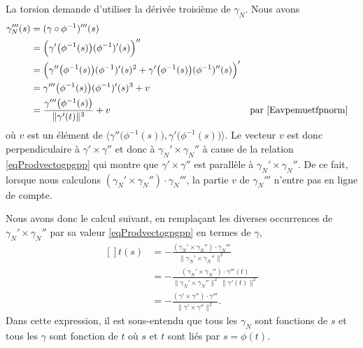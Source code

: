 La torsion demande d'utiliser la dérivée troisième de \( \gamma_N\). Nous avons
\begin{equation}
	\begin{aligned}[]
		\gamma_N'''(s) & =(\gamma\circ\phi^{-1})'''(s)                                                                                                                           \\
		               & =\Big( \gamma'\big( \phi^{-1}(s) \big)(\phi^{-1})'(s) \Big)''                                                                                           \\
		               & =\Big( \gamma''\big( \phi^{-1}(s) \big)(\phi^{-1})'(s)^2+\gamma'\big( \phi^{-1}(s) \big)(\phi^{-1})''(s) \Big)'                                         \\
		               & =\gamma'''\big( \phi^{-1}(s) \big)(\phi^{-1})'(s)^3+ v                                                                                                  \\
		               & =\frac{ \gamma'''\big( \phi^{-1}(s) \big) }{ \| \gamma'(t) \|^3 }+v                                             &  & \text{par \eqref{Eavpemuetfpnorm}}
	\end{aligned}
\end{equation}
où \( v\) est un élément de \( \langle \gamma''\big( \phi^{-1}(s) \big),\gamma'\big( \phi^{-1}(s) \big)\rangle\). Le vecteur \( v\) est donc perpendiculaire à \( \gamma'\times \gamma''\) et donc à \( \gamma_N'\times \gamma_N''\) à cause de la relation \eqref{eqProdvectogpgpp} qui montre que \( \gamma'\times \gamma''\) est parallèle à \( \gamma_N'\times \gamma_N''\). De ce fait, lorsque nous calculons \( (\gamma_N'\times \gamma_N'')\cdot \gamma_N'''\), la partie \( v\) de \( \gamma_N'''\) n'entre pas en ligne de compte.

Nous avons donc le calcul suivant, en remplaçant les diverses occurrences de \( \gamma_N'\times \gamma_N''\) par sa valeur \eqref{eqProdvectogpgpp} en termes de \( \gamma\),
\begin{equation}
	\begin{aligned}[]
		t(s) & =-\frac{ (\gamma_N'\times \gamma_N'')\cdot \gamma_N''' }{ \| \gamma_N'\times \gamma_N'' \|^2 }                      \\
		     & =-\frac{ (\gamma_N'\times \gamma_N'')\cdot \gamma'''(t) }{ \| \gamma_N'\times \gamma_N'' \|^2\,\| \gamma'(t) \|^2 } \\
		     & =-\frac{ (\gamma'\times \gamma'')\cdot \gamma''' }{ \| \gamma'\times \gamma'' \|^2 }.
	\end{aligned}
\end{equation}
Dans cette expression, il est sous-entendu que tous les \( \gamma_N\) sont fonctions de \( s\) et tous les \( \gamma\) sont fonction de \( t\) où \( s\) et \( t\) sont liés par \( s=\phi(t)\).

